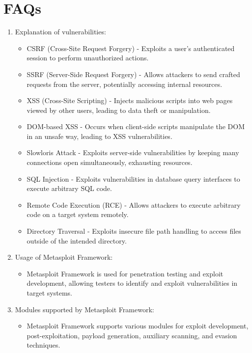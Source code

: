 \documentclass[11pt]{article}
\begin{document}
\section{FAQs}
\begin{enumerate}
    \item Explanation of vulnerabilities:
          \begin{itemize}
              \item CSRF (Cross-Site Request Forgery) - Exploits a user's authenticated session to perform unauthorized actions.
              \item SSRF (Server-Side Request Forgery) - Allows attackers to send crafted requests from the server, potentially accessing internal resources.
              \item XSS (Cross-Site Scripting) - Injects malicious scripts into web pages viewed by other users, leading to data theft or manipulation.
              \item DOM-based XSS - Occurs when client-side scripts manipulate the DOM in an unsafe way, leading to XSS vulnerabilities.
              \item Slowloris Attack - Exploits server-side vulnerabilities by keeping many connections open simultaneously, exhausting resources.
              \item SQL Injection - Exploits vulnerabilities in database query interfaces to execute arbitrary SQL code.
              \item Remote Code Execution (RCE) - Allows attackers to execute arbitrary code on a target system remotely.
              \item Directory Traversal - Exploits insecure file path handling to access files outside of the intended directory.
          \end{itemize}

    \item Usage of Metasploit Framework:
          \begin{itemize}
              \item Metasploit Framework is used for penetration testing and exploit development, allowing testers to identify and exploit vulnerabilities in target systems.
          \end{itemize}

    \item Modules supported by Metasploit Framework:
          \begin{itemize}
              \item Metasploit Framework supports various modules for exploit development, post-exploitation, payload generation, auxiliary scanning, and evasion techniques.
          \end{itemize}
\end{enumerate}
\end{document}
